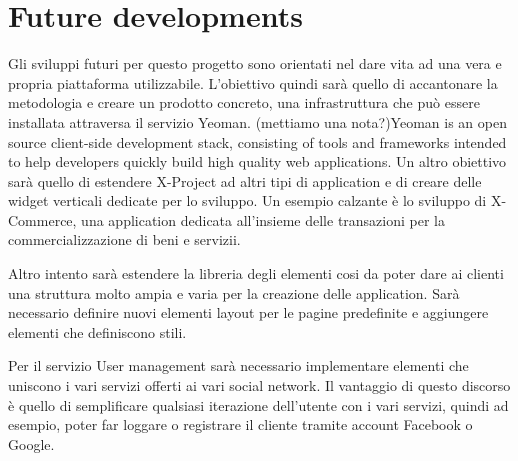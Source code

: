 \section{Future developments}
\label{sec:conclusions_future_developments}

Gli sviluppi futuri per questo progetto sono orientati nel dare vita ad una vera e propria piattaforma utilizzabile. L'obiettivo quindi sarà quello di accantonare la metodologia e creare un prodotto concreto, una infrastruttura che può essere installata attraversa il servizio Yeoman. (mettiamo una nota?)Yeoman is an open source client-side development stack, consisting of tools and frameworks intended to help developers quickly build high quality web applications. 
Un altro obiettivo sarà quello di estendere X-Project ad altri tipi di application e di creare delle widget verticali dedicate per lo sviluppo. Un esempio calzante è lo sviluppo di X-Commerce, una application dedicata all'insieme delle transazioni per la commercializzazione di beni e servizii.

Altro intento sarà estendere la libreria degli elementi cosi da poter dare ai clienti una struttura molto ampia e varia per la creazione delle application. Sarà necessario definire nuovi elementi layout per le pagine predefinite e aggiungere elementi che definiscono stili.


Per il servizio User management sarà necessario implementare elementi che uniscono i vari servizi offerti ai vari social network. Il vantaggio di questo discorso è quello di semplificare qualsiasi iterazione dell'utente con i vari servizi, quindi ad esempio, poter far loggare o registrare il cliente tramite account Facebook o Google.
